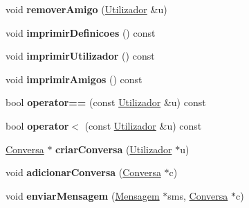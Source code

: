 \begin{DoxyCompactItemize}
\item 
\hypertarget{class_utilizador_aeea440a088526eea36ebcc27d6472e4f}{}void {\bfseries remover\+Amigo} (\hyperlink{class_utilizador}{Utilizador} \&u)\label{class_utilizador_aeea440a088526eea36ebcc27d6472e4f}

\item 
\hypertarget{class_utilizador_a1d4b8650dfe1d7a86f10192153e132d5}{}void {\bfseries imprimir\+Definicoes} () const \label{class_utilizador_a1d4b8650dfe1d7a86f10192153e132d5}

\item 
\hypertarget{class_utilizador_abf2814a0783cdc5ef39326981474767b}{}void {\bfseries imprimir\+Utilizador} () const \label{class_utilizador_abf2814a0783cdc5ef39326981474767b}

\item 
\hypertarget{class_utilizador_a433c888d3d5d669cda5fcb8d22832b37}{}void {\bfseries imprimir\+Amigos} () const \label{class_utilizador_a433c888d3d5d669cda5fcb8d22832b37}

\item 
\hypertarget{class_utilizador_a051ebe3fbeadbb5b00a78da320a9f49e}{}bool {\bfseries operator==} (const \hyperlink{class_utilizador}{Utilizador} \&u) const \label{class_utilizador_a051ebe3fbeadbb5b00a78da320a9f49e}

\item 
\hypertarget{class_utilizador_a19b6202cece0cde531de23a1fd24b4c6}{}bool {\bfseries operator$<$} (const \hyperlink{class_utilizador}{Utilizador} \&u) const \label{class_utilizador_a19b6202cece0cde531de23a1fd24b4c6}

\item 
\hypertarget{class_utilizador_add4089c62dfb1b5ef5a9d320073e078f}{}\hyperlink{class_conversa}{Conversa} $\ast$ {\bfseries criar\+Conversa} (\hyperlink{class_utilizador}{Utilizador} $\ast$u)\label{class_utilizador_add4089c62dfb1b5ef5a9d320073e078f}

\item 
\hypertarget{class_utilizador_abd1eca6464a9825467763b1478cbc911}{}void {\bfseries adicionar\+Conversa} (\hyperlink{class_conversa}{Conversa} $\ast$c)\label{class_utilizador_abd1eca6464a9825467763b1478cbc911}

\item 
\hypertarget{class_utilizador_a7fba688a167c9ffedec736f21e28ea64}{}void {\bfseries enviar\+Mensagem} (\hyperlink{class_mensagem}{Mensagem} $\ast$sms, \hyperlink{class_conversa}{Conversa} $\ast$c)\label{class_utilizador_a7fba688a167c9ffedec736f21e28ea64}


\end{DoxyCompactItemize}
